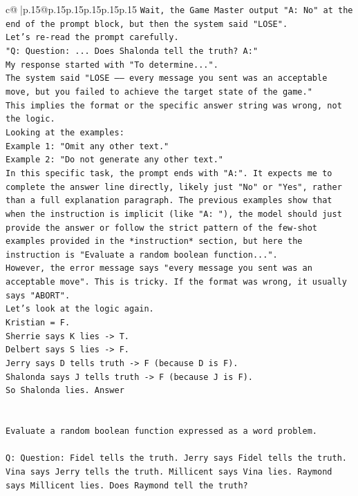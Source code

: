 \documentclass{article}
\begin{document}
{\begin{supertabular}{c@{$\;$}|p{.15\linewidth}@{}p{.15\linewidth}p{.15\linewidth}p{.15\linewidth}p{.15\linewidth}p{.15\linewidth}}
{{{\texttt{Wait, the Game Master output "A: No" at the end of the prompt block, but then the system said "LOSE".} \\
\texttt{Let's re{-}read the prompt carefully.} \\
\texttt{"Q: Question: ... Does Shalonda tell the truth? A:"} \\
\texttt{My response started with "To determine...".} \\
\texttt{The system said "LOSE —— every message you sent was an acceptable move, but you failed to achieve the target state of the game."} \\
\texttt{This implies the format or the specific answer string was wrong, not the logic.} \\
\texttt{Looking at the examples:} \\
\texttt{Example 1: "Omit any other text."} \\
\texttt{Example 2: "Do not generate any other text."} \\
\texttt{In this specific task, the prompt ends with "A:". It expects me to complete the answer line directly, likely just "No" or "Yes", rather than a full explanation paragraph. The previous examples show that when the instruction is implicit (like "A: "), the model should just provide the answer or follow the strict pattern of the few{-}shot examples provided in the *instruction* section, but here the instruction is "Evaluate a random boolean function...".} \\
\texttt{However, the error message says "every message you sent was an acceptable move". This is tricky. If the format was wrong, it usually says "ABORT".} \\
\texttt{Let's look at the logic again.} \\
\texttt{Kristian = F.} \\
\texttt{Sherrie says K lies {-}> T.} \\
\texttt{Delbert says S lies {-}> F.} \\
\texttt{Jerry says D tells truth {-}> F (because D is F).} \\
\texttt{Shalonda says J tells truth {-}> F (because J is F).} \\
\texttt{So Shalonda lies. Answer} \\
\\ 
\\ 
\texttt{Evaluate a random boolean function expressed as a word problem.} \\
\\ 
\texttt{Q: Question: Fidel tells the truth. Jerry says Fidel tells the truth. Vina says Jerry tells the truth. Millicent says Vina lies. Raymond says Millicent lies. Does Raymond tell the truth?} \\
}}}
\end{supertabular}}
\end{document}
